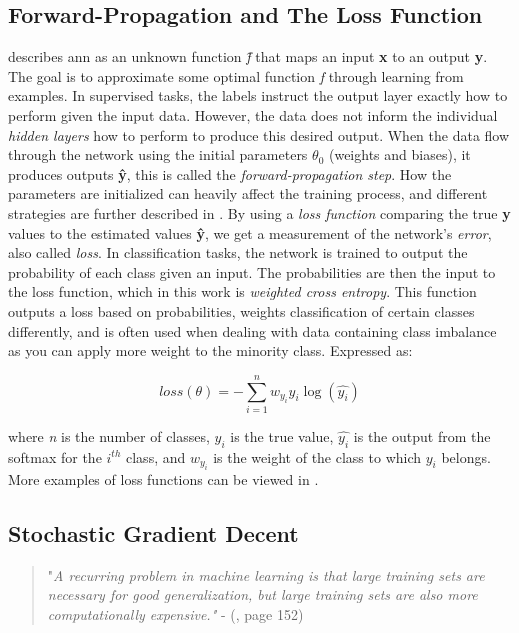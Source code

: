 \subsection{Forward-Propagation and The Loss Function}
    \citeauthor{Goodfellow-et-al-2016_NN}\cite{Goodfellow-et-al-2016_NN} describes \gls{ann} as an unknown function \textit{\^{f}} that maps an input \textbf{x} to an output \textbf{y}. The goal is to approximate some optimal function \textit{f} through learning from examples. In supervised tasks, the labels instruct the output layer exactly how to perform given the input data. However, the data does not inform the individual \textit{hidden layers} how to perform to produce this desired output. When the data flow through the network using the initial parameters $\theta_{0}$ (weights and biases), it produces outputs \textbf{\^{y}}, this is called the \textit{forward-propagation step}. How the parameters are initialized can heavily affect the training process, and different strategies are further described in \citeauthor{Goodfellow-et-al-2016_param_init}\cite{Goodfellow-et-al-2016_param_init}. By using a \textit{loss function} comparing the true \textbf{y} values to the estimated values \textbf{\^{y}}, we get a measurement of the network's \textit{error}, also called \textit{loss}. In classification tasks, the network is trained to output the probability of each class given an input\cite{ho2019real_weighted_cross_entropy}. The probabilities are then the input to the loss function, which in this work is \textit{weighted cross entropy}. This function outputs a loss based on probabilities, weights classification of certain classes differently, and is often used when dealing with data containing class imbalance as you can apply more weight to the minority class. Expressed as:
    
        \begin{equation} \label{cross_entropy}
            loss(\theta) = - \sum^{n}_{i=1} w_{y_{i}}y_{i}\log(\hat{y_{i}})
        \end{equation}
    
    where \textit{n} is the number of classes, $y_{i}$ is the true value, $\hat{y_{i}}$ is the output from the softmax for the $i^{th}$ class, and $w_{y_{i}}$ is the weight of the class to which $y_{i}$ belongs. More examples of loss functions can be viewed in \citeauthor{mishra2017deep}\cite{mishra2017deep}.
    


\subsection{Stochastic Gradient Decent} \label{batch learning}
        \begin{quote}
        "\textit{A recurring problem in machine learning is that large training sets are necessary for good generalization, but large training sets are also more computationally
        expensive."} - (\citeauthor{Goodfellow-et-al-2016_SGD}\citeyear{Goodfellow-et-al-2016_SGD}, page 152)
    \end{quote}
    
